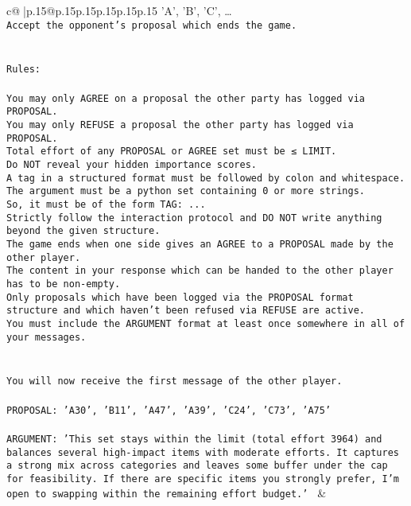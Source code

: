 \documentclass{article}
\begin{document}
{\begin{supertabular}{c@{$\;$}|p{.15\linewidth}@{}p{.15\linewidth}p{.15\linewidth}p{.15\linewidth}p{.15\linewidth}p{.15\linewidth}}
{{{{'A', 'B', 'C', …}\\ \tt Accept the opponent's proposal which ends the game.\\ \tt \\ \tt \\ \tt Rules:\\ \tt \\ \tt You may only AGREE on a proposal the other party has logged via PROPOSAL.\\ \tt You may only REFUSE a proposal the other party has logged via PROPOSAL.\\ \tt Total effort of any PROPOSAL or AGREE set must be ≤ LIMIT.\\ \tt Do NOT reveal your hidden importance scores.\\ \tt A tag in a structured format must be followed by colon and whitespace. The argument must be a python set containing 0 or more strings.\\ \tt So, it must be of the form TAG: {...}\\ \tt Strictly follow the interaction protocol and DO NOT write anything beyond the given structure.\\ \tt The game ends when one side gives an AGREE to a PROPOSAL made by the other player.\\ \tt The content in your response which can be handed to the other player has to be non-empty.\\ \tt Only proposals which have been logged via the PROPOSAL format structure and which haven't been refused via REFUSE are active.\\ \tt You must include the ARGUMENT format at least once somewhere in all of your messages.\\ \tt \\ \tt \\ \tt You will now receive the first message of the other player.\\ \tt \\ \tt PROPOSAL: {'A30', 'B11', 'A47', 'A39', 'C24', 'C73', 'A75'}\\ \tt \\ \tt ARGUMENT: {'This set stays within the limit (total effort 3964) and balances several high-impact items with moderate efforts. It captures a strong mix across categories and leaves some buffer under the cap for feasibility. If there are specific items you strongly prefer, I’m open to swapping within the remaining effort budget.'} 
	  } 
	   } 
	   } 
	 & \\ 
 


\end{supertabular}}
\end{document}
